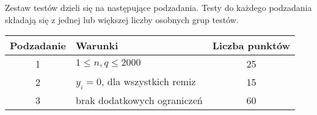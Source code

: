 \documentclass[10pt]{article}
\begin{document}
    Zestaw testów dzieli się na następujące podzadania. Testy do każdego podzadania składają się z jednej lub większej liczby osobnych grup testów.
    
    \begin{center}
        \begin{tabular}{ |c|p{9cm}|c| }
            \hline
            \textbf{Podzadanie} & \textbf{Warunki} & \textbf{Liczba punktów}\\
            \hline
            1 & $1 \leq n, q \leq 2000$ & 25\\
            \hline
            2 & $y_{i} = 0$, dla wszystkich remiz & 15\\
            \hline
            3 & brak dodatkowych ograniczeń & 60\\
            \hline
        \end{tabular}
    \end{center}
\end{document}
